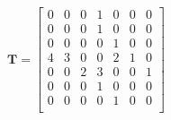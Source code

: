 \begin{equation}
\textbf{T} = \begin{bmatrix} 
                0 & 0 & 0 & 1 & 0 & 0 & 0               \\ 
                0 & 0 & 0 & 1 & 0 & 0 & 0               \\ 
                0 & 0 & 0 & 0 & 1 & 0 & 0               \\ 
                4 & 3 & 0 & 0 & 2 & 1 & 0               \\ 
                0 & 0 & 2 & 3 & 0 & 0 & 1               \\ 
                0 & 0 & 0 & 1 & 0 & 0 & 0               \\ 
                0 & 0 & 0 & 0 & 1 & 0 & 0               \\ \end{bmatrix}
    \label{eq:topo}
\end{equation}\shortvertbreak


